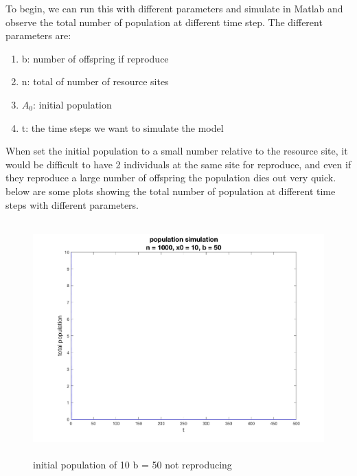 \documentclass[12pt]{article}
\begin{document}
To begin, we can run this with different parameters and simulate in Matlab and observe the total number of population at different time step. The different parameters are: 

\begin{enumerate}
\item b: number of offspring if reproduce
\item n: total of number of resource sites
\item $A_{0}$: initial population
\item t: the time steps we want to simulate the model
\end{enumerate}


When set the initial population to a small number relative to the resource site, it would be difficult to have 2 individuals at the same site for reproduce, and even if they reproduce a large number of offspring the population dies out very quick. 
below are some plots showing the total number of population at different time steps with different parameters. 

\begin{figure}[H] %
\centering
\includegraphics[width = 12 cm, height = 9cm]{single_run n1000 x010 b50.png}
\caption{initial population of 10 b = 50 not reproducing}
\label{fig:p1s1}
\end{figure}
\end{document}
